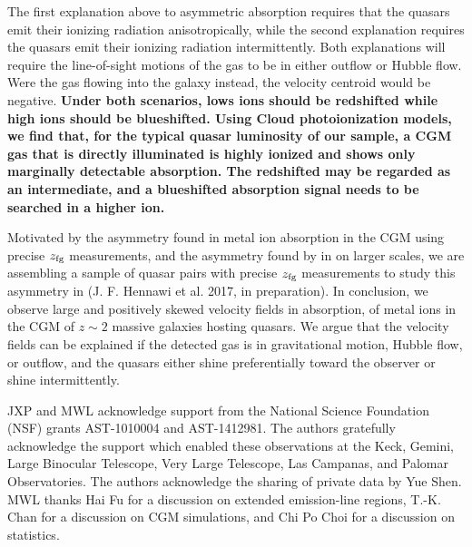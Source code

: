 \documentclass[iop]{emulateapj}
\begin{document}
{%
The first explanation above to asymmetric
absorption requires that the quasars emit their ionizing radiation anisotropically, while the 
second explanation requires the quasars emit their ionizing radiation intermittently. Both 
explanations will require the line-of-sight motions of the gas to be in either outflow or Hubble 
flow. Were the gas flowing into the galaxy instead, the velocity centroid would be negative.
{\bf Under both scenarios, lows ions should be redshifted while high ions should be blueshifted.
Using Cloud photoionization models, we find that, for the typical quasar luminosity of our sample,
a CGM gas that is directly illuminated is highly ionized and shows only marginally detectable
 absorption. The redshifted  may be regarded as an intermediate, and a
blueshifted absorption signal needs to be searched in a higher ion.}

Motivated by the asymmetry found in metal ion absorption in the CGM using precise $z_{\rm fg}$ 
measurements, and the asymmetry found by \cite{KirkmanTytler08} in  on larger 
scales, we are assembling a sample of quasar pairs with precise $z_{\rm fg}$ measurements to study 
this asymmetry in  (J. F. Hennawi et al. 2017, in preparation). In conclusion, we 
observe large and positively skewed velocity fields in absorption, of metal ions 
in the CGM of $z\sim2$ massive galaxies hosting quasars. We argue that the velocity fields can be 
explained if the detected gas is in gravitational motion, Hubble flow, or outflow, and the quasars 
either shine preferentially toward the observer or shine intermittently. 

\acknowledgements

JXP and MWL acknowledge support from the National Science Foundation (NSF) grants AST-1010004 and 
AST-1412981. The authors gratefully acknowledge the support which enabled these observations at 
the Keck, Gemini, Large Binocular Telescope, Very Large Telescope, Las Campanas, and Palomar 
Observatories. The authors acknowledge the sharing of private data by Yue Shen. MWL thanks Hai Fu
for a discussion on extended emission-line regions, T.-K. Chan for a discussion on CGM
simulations, and Chi Po Choi for a discussion on statistics.

}
\end{document}
